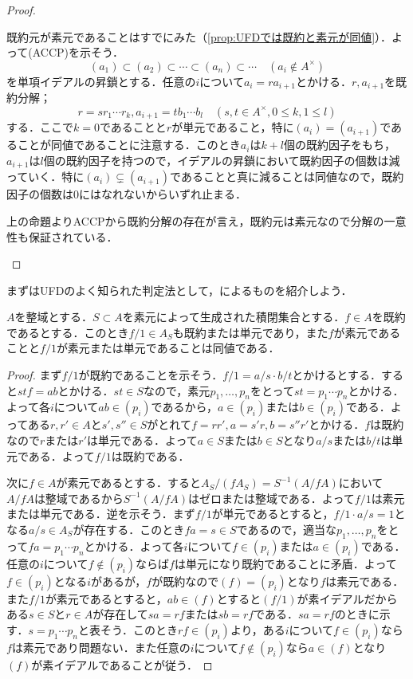 \begin{proof}
	\begin{eqv}
		\item
	既約元が素元であることはすでにみた（\ref{prop:UFDでは既約と素元が同値}）．よって(ACCP)を示そう．
		\[(a_1)\subset (a_2)\subset\cdots\subset(a_n)\subset\cdots\quad(a_i\not\in A^\times)\]
		を単項イデアルの昇鎖とする．任意の$i$について$a_i=ra_{i+1}$とかける．$r,a_{i+1}$を既約分解；
		\[r=sr_1\cdots r_k, a_{i+1}=tb_1\cdots b_l\quad(s,t\in A^\times, 0\leq k,1\leq l)\]
		する．ここで$k=0$であることと$r$が単元であること，特に$(a_i)=(a_{i+1})$であることが同値であることに注意する．このとき$a_i$は$k+l$個の既約因子をもち，$a_{i+1}$は$l$個の既約因子を持つので，イデアルの昇鎖において既約因子の個数は減っていく．特に$(a_i)\subsetneq(a_{i+1})$であることと真に減ることは同値なので，既約因子の個数は$0$にはなれないからいずれ止まる．
		\item 上の命題よりACCPから既約分解の存在が言え，既約元は素元なので分解の一意性も保証されている．
	\end{eqv}
\end{proof}

まずはUFDのよく知られた判定法として，\cite{Nagata1957}によるものを紹介しよう．
\begin{lem}
	$A$を整域とする．$S\subset A$を素元によって生成された積閉集合とする．$f\in A$を既約であるとする．このとき$f/1\in A_S$も既約または単元であり，また$f$が素元であることと$f/1$が素元または単元であることは同値である．
\end{lem}

\begin{proof}
	まず$f/1$が既約であることを示そう．$f/1=a/s\cdot b/t$とかけるとする．すると$stf=ab$とかける．$st\in S$なので，素元$p_1,\dots,p_n$をとって$st=p_1\cdots p_n$とかける．よって各$i$について$ab\in (p_i)$であるから，$a\in (p_i)$または$b\in (p_i)$である．よってある$r,r'\in A$と$s',s''\in S$がとれて$f=rr',a=s'r,b=s''r'$とかける．$f$は既約なので$r$または$r'$は単元である．よって$a\in S$または$b\in S$となり$a/s$または$b/t$は単元である．よって$f/1$は既約である．
	
	次に$f\in A$が素元であるとする．すると$A_S/(fA_S)=S^{-1}(A/fA)$において$A/fA$は整域であるから$S^{-1}(A/fA)$はゼロまたは整域である．よって$f/1$は素元または単元である．逆を示そう．まず$f/1$が単元であるとすると，$f/1\cdot a/s=1$となる$a/s\in A_S$が存在する．このとき$fa=s\in S$であるので，適当な$p_1,\dots,p_n$をとって$fa=p_1\cdots p_n$とかける．よって各$i$について$f\in (p_i)$または$a\in (p_i)$である．任意の$i$について$f\not\in (p_i)$ならば$f$は単元になり既約であることに矛盾．よって$f\in (p_i)$となる$i$があるが，$f$が既約なので$(f)=(p_i)$となり$f$は素元である．また$f/1$が素元であるとすると，$ab\in (f)$とすると$(f/1)$が素イデアルだからある$s\in S$と$r\in A$が存在して$sa=rf$または$sb=rf$である．$sa=rf$のときに示す．$s=p_1\cdots p_n$と表そう．このとき$rf\in (p_i)$より，ある$i$について$f\in (p_i)$なら$f$は素元であり問題ない．また任意の$i$について$f\not\in (p_i)$なら$a\in (f)$となり$(f)$が素イデアルであることが従う．
\end{proof}

